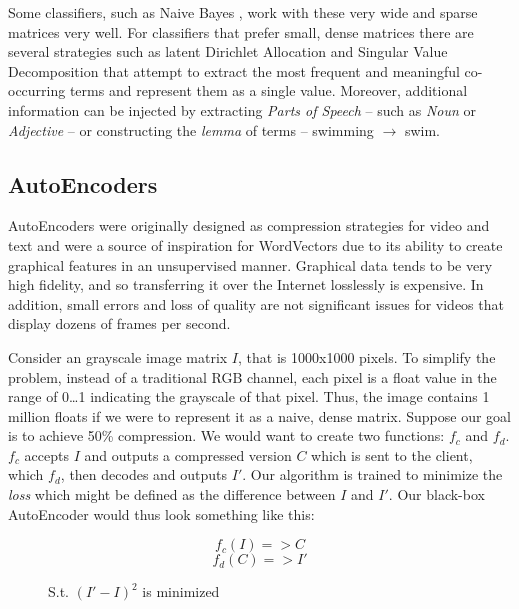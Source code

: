 \par{
Some classifiers, such as Naive Bayes \cite{rish2001empirical}, work with these very wide and sparse matrices very well. For classifiers that prefer small, dense matrices there are several strategies such as latent Dirichlet Allocation \cite{blei2003latent} and Singular Value Decomposition \cite{liu2007webi} that attempt to extract the most frequent and meaningful co-occurring terms and represent them as a single value. Moreover, additional information can be injected by extracting \textit{Parts of Speech} -- such as \textit{Noun} or \textit{Adjective} -- or constructing the \textit{lemma} of terms -- swimming $\rightarrow$ swim. 
}

\subsection{AutoEncoders}

\par{
AutoEncoders were originally designed as compression strategies for video and text and were a source of inspiration for WordVectors due to its ability to create graphical features in an unsupervised manner. Graphical data tends to be very high fidelity, and so transferring it over the Internet losslessly is expensive. In addition, small errors and loss of quality are not significant issues for videos that display dozens of frames per second.
}
\par{
Consider an grayscale image matrix $I$, that is \textsf{1000x1000} pixels. To simplify the problem, instead of a traditional RGB channel, each pixel is a float value in the range of 0\ldots1 indicating the grayscale of that pixel. Thus, the image contains 1 million floats if we were to represent it as a naive, dense matrix. Suppose our goal is to achieve 50\% compression. We would want to create two functions: $f_c$ and $f_d$. $f_c$ accepts $I$ and outputs a compressed version $C$ which is sent to the client, which $f_d$, then decodes and outputs $I'$. Our algorithm is trained to minimize the \textit{loss} which might be defined as the difference between $I$ and $I'$. Our black-box AutoEncoder would thus look something like this:
}

\begin{figure}[h]
\[f_c(I) => C \]
\[ f_d(C) => I' \]
\caption{S.t. $(I' - I)^2$ is minimized}
\end{figure}

